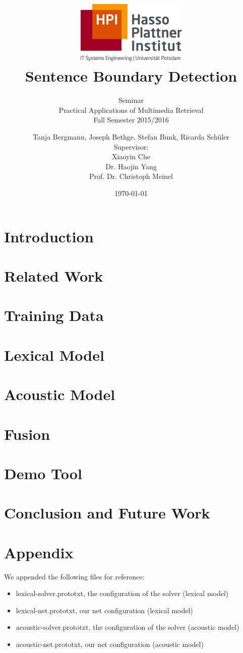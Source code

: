 \documentclass[a4paper,12pt,pagesize,headsepline,bibliography=totoc,titlepage]{scrartcl}
\title{
	\includegraphics*[width=0.4\textwidth]{img/hpi_logo.png}\\
	\vspace{24pt}
	Sentence Boundary Detection
}
\subtitle{
	Seminar\\
	Practical Applications of Multimedia Retrieval\\
	Fall Semester 2015/2016
}
\author{
	Tanja Bergmann, Joseph Bethge, Stefan Bunk, Ricarda Schüler\\[12pt]
	Supervisor:\\
    Xiaoyin Che\\
	Dr. Haojin Yang\\
	Prof. Dr. Christoph Meinel
}
\date{\today}
\begin{document}
\maketitle
\tableofcontents
\newpage

\section{Introduction}
\label{sec:introduction}


\section{Related Work}
\label{sec:related_work}


\section{Training Data}
\label{sec:training_data}


\section{Lexical Model}
\label{sec:lexical_model}


\section{Acoustic Model}
\label{sec:acoustic_model}


\section{Fusion}
\label{sec:fusion}


\section{Demo Tool}
\label{sec:demo}


\section{Conclusion and Future Work}
\label{sec:future}





\newpage
\appendix
\section{Appendix}
We appended the following files for reference:
\begin{itemize}
    \item lexical-solver.prototxt, the configuration of the solver (lexical model)
    \item lexical-net.prototxt, our net configuration (lexical model)
    \item acoustic-solver.prototxt, the configuration of the solver (acoustic model)
    \item acoustic-net.prototxt, our net configuration (acoustic model)
\end{itemize}
\end{document}
